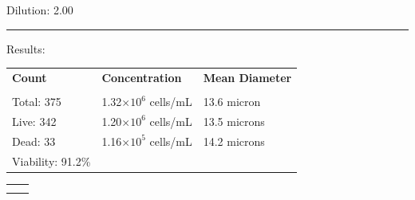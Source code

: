 \documentclass[UTF8,10pt,a4paper,fontset=fandol]{ctexart}
\newcommand{\fieldvalue}[1]{#1}
\begin{document}
Dilution: 
\fieldvalue{2.00}

\noindent\rule{\textwidth}{0.4pt}

Results:

\vspace{0.5em}

\begin{tabularx}{\textwidth}{@{}XXX@{}}
\textbf{Count} & \textbf{Concentration} & \textbf{Mean Diameter} \\
\underline{\hspace{0.9\linewidth}} &
\underline{\hspace{0.9\linewidth}} &
\underline{\hspace{0.9\linewidth}} \\[0.2em]
Total: 
\fieldvalue{375}
&
\fieldvalue{1.32$\times 10^{6}$ cells/mL}
&
\fieldvalue{13.6 micron}
\\
Live: 
\fieldvalue{342}
&
\fieldvalue{1.20$\times 10^{6}$ cells/mL}
&
\fieldvalue{13.5 microns}
\\
Dead: 
\fieldvalue{33}
&
\fieldvalue{1.16$\times 10^{5}$ cells/mL}
&
\fieldvalue{14.2 microns}
\\
Viability: 
\fieldvalue{91.2\%}
&
&
\end{tabularx}

\vspace{1em}

\begin{center}
\setlength{\fboxsep}{4pt}
\begin{tabular}{cc}
\fbox{\rule{0pt}{0.20\textheight}\rule{0.43\textwidth}{0pt}} &
\fbox{\rule{0pt}{0.20\textheight}\rule{0.43\textwidth}{0pt}} \\[1em]
\fbox{\rule{0pt}{0.20\textheight}\rule{0.43\textwidth}{0pt}} &
\fbox{\rule{0pt}{0.20\textheight}\rule{0.43\textwidth}{0pt}}
\end{tabular}
\end{center}
\end{document}

